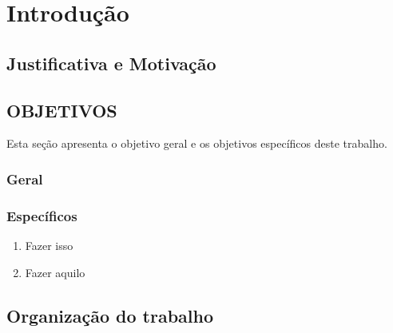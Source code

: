 \chapter{Introdução}


\section{Justificativa e Motivação}



\section{OBJETIVOS}

Esta seção apresenta o objetivo geral e os objetivos específicos deste trabalho.

\subsection{Geral}



\subsection{Específicos}
\begin{enumerate}
	\item Fazer isso
	\item Fazer aquilo
\end{enumerate}

\section{Organização do trabalho}

